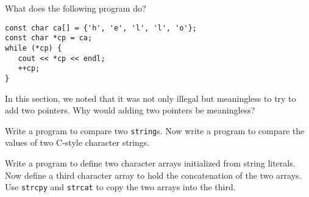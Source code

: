 %
%
\begin{question}
What does the following program do?
\begin{lstlisting}
const char ca[] = {'h', 'e', 'l', 'l', 'o'};
const char *cp = ca;
while (*cp) {
   cout << *cp << endl;
   ++cp;
}
\end{lstlisting}
\end{question}

\begin{question}
In this section, we noted that it was not only illegal but
meaningless to try to add two pointers. Why would adding two pointers be meaningless?
\end{question}

\begin{question}
Write a program to compare two \verb|string|s. Now write a
program to compare the values of two C-style character strings.
\end{question}

\begin{question}
Write a program to define two character arrays initialized
from string literals. Now define a third character array to hold the
concatenation of the two arrays. Use \verb|strcpy| and \verb|strcat| to copy the two
arrays into the third.
\end{question}
